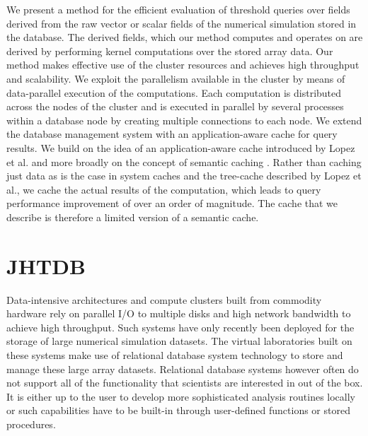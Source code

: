 \documentclass{sig-alternate}
\begin{document}
We present a method for the efficient evaluation of threshold queries over fields derived from the raw vector or scalar fields of the numerical simulation 
stored in the database. The derived fields, which our method computes and operates on are derived by performing kernel computations over the 
stored array data.
Our method makes effective use of the cluster resources and achieves high throughput and scalability. 
We exploit the parallelism 
available in the cluster by means of data-parallel execution of the computations. Each computation is distributed across the nodes of the cluster and
is executed in parallel by several processes within a database node by creating multiple connections to each node. We extend the database management
system with an
application-aware cache for query results. We build on the idea of an application-aware cache introduced by Lopez et al. \cite{Lopez} and more broadly 
on the concept of semantic caching \cite{Dar}. Rather than caching just data as is the case in system caches and the tree-cache described by Lopez et al.,
we cache the actual results of the computation, which leads to query performance improvement of over an order of magnitude.
The cache that we describe is therefore a limited version of a semantic cache.


\section{JHTDB}\label{jhtdb}
Data-intensive architectures and compute clusters built from commodity hardware rely on parallel I/O to multiple disks and high network bandwidth
to achieve high throughput. Such systems have only recently been deployed for the storage of large numerical simulation 
datasets. The virtual laboratories built on these systems make use of relational database system technology to store and manage these large array datasets.
Relational database systems however often do not support
all of the functionality that scientists are interested in out of the box. It is either up to the user to develop more sophisticated analysis routines locally or such
capabilities have to be built-in through user-defined functions or stored procedures. 
\end{document}
